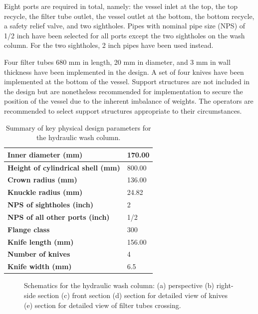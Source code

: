 Eight ports are required in total, namely: the vessel inlet at the top, the top recycle, the filter tube outlet, the vessel outlet at the bottom, the bottom recycle, a safety relief valve, and two sightholes. Pipes with nominal pipe size (NPS) of 1/2 inch have been selected for all ports except the two sightholes on the wash column. For the two sightholes, 2 inch pipes have been used instead. 

Four filter tubes 680 mm in length, 20 mm in diameter, and 3 mm in wall thickness have been implemented in the design. A set of four knives have been implemented at the bottom of the vessel. Support structures are not included in the design but are nonetheless recommended for implementation to secure the position of the vessel due to the inherent imbalance of weights. The operators are recommended to select support structures appropriate to their circumstances. 

\begin{table}[h] \label{tab:wash column mech design summary}
\centering
\caption{Summary of key physical design parameters for the hydraulic wash column.}
\begin{tabular}{@{}l|l@{}}
\toprule
\textbf{Inner diameter (mm)}                &    170.00 \\ \midrule
\textbf{Height of cylindrical shell (mm)}   & 800.00 \\ \midrule
\textbf{Crown radius (mm)}                  & 136.00 \\ \midrule
\textbf{Knuckle radius (mm)}                & 24.82  \\ \midrule
\textbf{NPS of sightholes (inch)}                & 2 \\ \midrule
\textbf{NPS of all other ports (inch)}                & 1/2 \\ \midrule
\textbf{Flange class}                       & 300 \\ \midrule
\textbf{Knife length (mm)}              & 156.00 \\ \midrule
\textbf{Number of knives}            & 4 \\ \midrule
\textbf{Knife width (mm)}          & 6.5 \\ \bottomrule
\end{tabular}
\end{table}

\begin{figure}[h]
    \centering
    
    \caption{Schematics for the hydraulic wash column: (a) perspective (b) right-side section (c) front section (d) section for detailed view of knives (e) section for detailed view of filter tubes crossing.}
    \label{fig:wash column schematic}
\end{figure}

